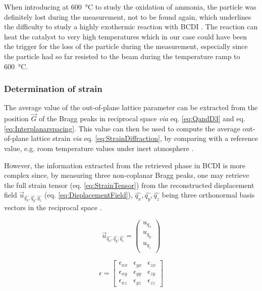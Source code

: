 When introducing  at \qty{600}{\degreeCelsius} to study the oxidation of ammonia, the particle was definitely lost during the measurement, not to be found again, which underlines the difficulty to study a highly exothermic reaction with BCDI \parencite{PerezRamirez2004, Hatscher2008}.
The reaction can heat the catalyst to very high temperatures which in our case could have been the trigger for the loss of the particle during the measurement, especially since the particle had so far resisted to the beam during the temperature ramp to \qty{600}{\degreeCelsius}.

\subsubsection{Determination of strain}

The average value of the out-of-plane lattice parameter can be extracted from the position $\vec{G}$ of the Bragg peaks in reciprocal space \textit{via} eq. \ref{eq:QandD3} and eq. \ref{eq:Interplanarspacing}.
This value can then be used to compute the average out-of-plane lattice strain \textit{via} eq. \ref{eq:StrainDiffraction}, by comparing with a reference value, e.g. room temperature values under inert atmosphere \parencite{Fernandez2019}.

However, the information extracted from the retrieved phase in BCDI is more complex since, by measuring three non-coplanar Bragg peaks, one may retrieve the full strain tensor (eq. \ref{eq:StrainTensor}) from the reconstructed displacement field $\vec{u}_{\hat{q_x}, \hat{q_y}, \hat{q_z}}$ (eq. \ref{eq:DisplacementField}), $\hat{q_x}, \hat{q_y}, \hat{q_z}$ being three orthonormal basis vectors in the reciprocal space \parencite{Karpov2019}.

\begin{equation}
    \vec{u}_{\hat{q_x}, \hat{q_y}, \hat{q_z}} =
     \begin{pmatrix}
        u_{q_x} \\
        u_{q_y} \\
        u_{q_z} \\
     \end{pmatrix}
     \label{eq:DisplacementField}
\end{equation}

\begin{equation}
    \epsilon =
    \begin{bmatrix}
        \epsilon_{xx} & \epsilon_{yx} & \epsilon_{zx}\\
        \epsilon_{xy} & \epsilon_{yy} & \epsilon_{zy}\\
        \epsilon_{xz} & \epsilon_{yz} & \epsilon_{zz}
    \end{bmatrix}
    \label{eq:StrainTensor}
\end{equation}

